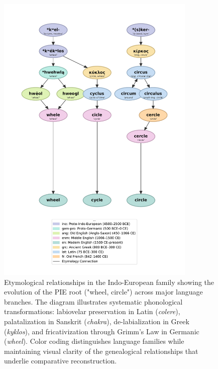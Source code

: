 \begin{figure}[htbp]
\centering
\includegraphics[width=0.85\textwidth,height=0.75\textheight,keepaspectratio]{05_CircleWheel/etymology_graph_portrait_v105.pdf}
\caption*{Etymological relationships in the Indo-European family showing the evolution of the PIE root  ("wheel, circle") across major language branches. The diagram illustrates systematic phonological transformations: labiovelar preservation in Latin (\emph{colere}), palatalization in Sanskrit (\emph{chakra}), de-labialization in Greek (\emph{kyklos}), and fricativization through Grimm's Law in Germanic (\emph{wheel}). Color coding distinguishes language families while maintaining visual clarity of the genealogical relationships that underlie comparative reconstruction.}
\end{figure}
